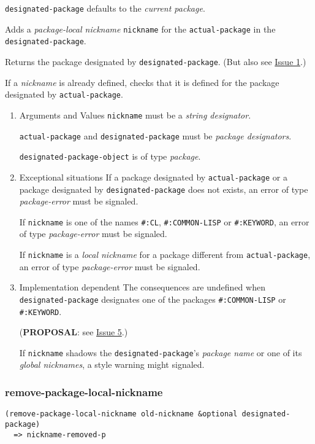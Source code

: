 \documentclass[11pt]{article}
\begin{document}
\texttt{designated-package} defaults to the \emph{current package}.

Adds a \emph{package-local nickname} \texttt{nickname} for the \texttt{actual-package} in the
\texttt{designated-package}.

Returns the package designated by \texttt{designated-package}. (But also see \hyperref[sec:org6f1e9ed]{Issue 1}.)

If a \emph{nickname} is already defined, checks that it is defined for the package
designated by \texttt{actual-package}.
\begin{enumerate}
\item Arguments and Values
\label{sec:org7b3d17b}
\texttt{nickname} must be a \emph{string designator}.

\texttt{actual-package} and \texttt{designated-package} must be \emph{package designators}.

\texttt{designated-package-object} is of type \emph{package}.
\item Exceptional situations
\label{sec:org07f12c7}
If a package designated by \texttt{actual-package} or a package designated by
\texttt{designated-package} does not exists, an error of type \emph{package-error}
must be signaled.

If \texttt{nickname} is one of the names \texttt{\#:CL}, \texttt{\#:COMMON-LISP} or \texttt{\#:KEYWORD},
an error of type \emph{package-error} must be signaled.

If \texttt{nickname} is a \emph{local nickname} for a package different from
\texttt{actual-package}, an error of type \emph{package-error} must be signaled.
\item Implementation dependent
\label{sec:org1018bc3}
The consequences are undefined when \texttt{designated-package} designates one of the
packages \texttt{\#:COMMON-LISP} or \texttt{\#:KEYWORD}.

(\textbf{PROPOSAL}: see \hyperref[sec:org39f8c46]{Issue 5}.)

If \texttt{nickname} shadows the \texttt{designated-package}'s \emph{package name} or one of its
\emph{global nicknames}, a style warning might signaled.
\end{enumerate}
\subsubsection{remove-package-local-nickname}
\label{sec:org4664ddd}
\begin{verbatim}
(remove-package-local-nickname old-nickname &optional designated-package)
  => nickname-removed-p
\end{verbatim}
\end{document}
